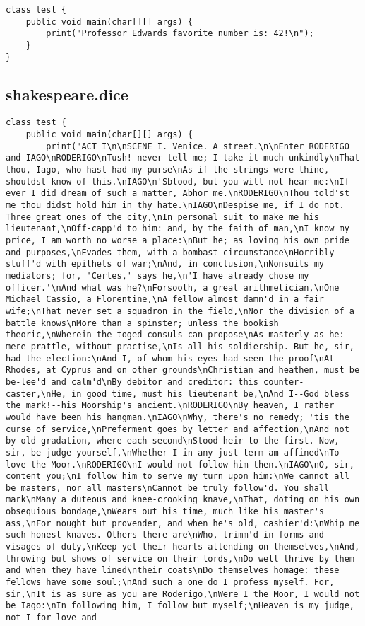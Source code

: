 \begin{verbatim}
class test {
	public void main(char[][] args) {
		print("Professor Edwards favorite number is: 42!\n");
	}
}
\end{verbatim}\pagebreak\subsection{shakespeare.dice}
\begin{verbatim}
class test {
	public void main(char[][] args) {
		print("ACT I\n\nSCENE I. Venice. A street.\n\nEnter RODERIGO and IAGO\nRODERIGO\nTush! never tell me; I take it much unkindly\nThat thou, Iago, who hast had my purse\nAs if the strings were thine, shouldst know of this.\nIAGO\n'Sblood, but you will not hear me:\nIf ever I did dream of such a matter, Abhor me.\nRODERIGO\nThou told'st me thou didst hold him in thy hate.\nIAGO\nDespise me, if I do not. Three great ones of the city,\nIn personal suit to make me his lieutenant,\nOff-capp'd to him: and, by the faith of man,\nI know my price, I am worth no worse a place:\nBut he; as loving his own pride and purposes,\nEvades them, with a bombast circumstance\nHorribly stuff'd with epithets of war;\nAnd, in conclusion,\nNonsuits my mediators; for, 'Certes,' says he,\n'I have already chose my officer.'\nAnd what was he?\nForsooth, a great arithmetician,\nOne Michael Cassio, a Florentine,\nA fellow almost damn'd in a fair wife;\nThat never set a squadron in the field,\nNor the division of a battle knows\nMore than a spinster; unless the bookish theoric,\nWherein the toged consuls can propose\nAs masterly as he: mere prattle, without practise,\nIs all his soldiership. But he, sir, had the election:\nAnd I, of whom his eyes had seen the proof\nAt Rhodes, at Cyprus and on other grounds\nChristian and heathen, must be be-lee'd and calm'd\nBy debitor and creditor: this counter-caster,\nHe, in good time, must his lieutenant be,\nAnd I--God bless the mark!--his Moorship's ancient.\nRODERIGO\nBy heaven, I rather would have been his hangman.\nIAGO\nWhy, there's no remedy; 'tis the curse of service,\nPreferment goes by letter and affection,\nAnd not by old gradation, where each second\nStood heir to the first. Now, sir, be judge yourself,\nWhether I in any just term am affined\nTo love the Moor.\nRODERIGO\nI would not follow him then.\nIAGO\nO, sir, content you;\nI follow him to serve my turn upon him:\nWe cannot all be masters, nor all masters\nCannot be truly follow'd. You shall mark\nMany a duteous and knee-crooking knave,\nThat, doting on his own obsequious bondage,\nWears out his time, much like his master's ass,\nFor nought but provender, and when he's old, cashier'd:\nWhip me such honest knaves. Others there are\nWho, trimm'd in forms and visages of duty,\nKeep yet their hearts attending on themselves,\nAnd, throwing but shows of service on their lords,\nDo well thrive by them and when they have lined\ntheir coats\nDo themselves homage: these fellows have some soul;\nAnd such a one do I profess myself. For, sir,\nIt is as sure as you are Roderigo,\nWere I the Moor, I would not be Iago:\nIn following him, I follow but myself;\nHeaven is my judge, not I for love and 
\end{verbatim}
